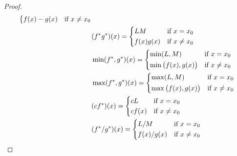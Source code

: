 \begin{proof}
\begin{align*}
\begin{dcases}
                                                         f(x) - g(x) & \text{if } x \neq x_0
                                                       \end{dcases}                     \\
                                    & (f^* g^*)(x) = \begin{dcases}
                                                       LM        & \text{if } x = x_0    \\
                                                       f(x) g(x) & \text{if } x \neq x_0
                                                     \end{dcases}                         \\
                                    & \min(f^*, g^*)(x) = \begin{dcases}
                                                            \min(L, M)               & \text{if } x = x_0    \\
                                                            \min\big(f(x), g(x)\big) & \text{if } x \neq x_0
                                                          \end{dcases}     \\
                                    & \max(f^*, g^*)(x) = \begin{dcases}
                                                            \max(L, M)               & \text{if } x = x_0    \\
                                                            \max\big(f(x), g(x)\big) & \text{if } x \neq x_0
                                                          \end{dcases}     \\
                                    & (c f^*)(x) = \begin{dcases}
                                                     cL     & \text{if } x = x_0    \\
                                                     c f(x) & \text{if } x \neq x_0
                                                   \end{dcases}                              \\
                                    & (f^* / g^*)(x) = \begin{dcases}
                                                         L / M       & \text{if } x = x_0    \\
                                                         f(x) / g(x) & \text{if } x \neq x_0

\end{dcases}
\end{align*}
\end{proof}
